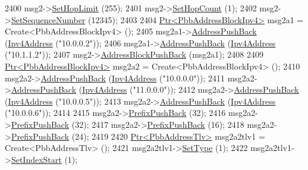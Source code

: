 \begin{DoxyCode}
2400     msg2->\hyperlink{classns3_1_1PbbMessage_a532a7e5e135f7491f8a84ab1dfadd28f}{SetHopLimit} (255);
2401     msg2->\hyperlink{classns3_1_1PbbMessage_a882ec7e2e9a9dff6297152c196d54ce4}{SetHopCount} (1);
2402     msg2->\hyperlink{classns3_1_1PbbMessage_a8c24696ac67507afa03c9750daccc47d}{SetSequenceNumber} (12345);
2403 
2404     \hyperlink{classns3_1_1Ptr}{Ptr<PbbAddressBlockIpv4>} msg2a1 = Create<PbbAddressBlockIpv4> ();
2405     msg2a1->\hyperlink{classns3_1_1PbbAddressBlock_a7be545a53d69bd426dbebcf752ed8371}{AddressPushBack} (\hyperlink{classns3_1_1Ipv4Address}{Ipv4Address} (\textcolor{stringliteral}{"10.0.0.2"}));
2406     msg2a1->\hyperlink{classns3_1_1PbbAddressBlock_a7be545a53d69bd426dbebcf752ed8371}{AddressPushBack} (\hyperlink{classns3_1_1Ipv4Address}{Ipv4Address} (\textcolor{stringliteral}{"10.1.1.2"}));
2407     msg2->\hyperlink{classns3_1_1PbbMessage_a5f623bad2fb1adde7da885e1c92d5311}{AddressBlockPushBack} (msg2a1);
2408 
2409     \hyperlink{classns3_1_1Ptr}{Ptr<PbbAddressBlockIpv4>} msg2a2 = Create<PbbAddressBlockIpv4> ();
2410     msg2a2->\hyperlink{classns3_1_1PbbAddressBlock_a7be545a53d69bd426dbebcf752ed8371}{AddressPushBack} (\hyperlink{classns3_1_1Ipv4Address}{Ipv4Address} (\textcolor{stringliteral}{"10.0.0.0"}));
2411     msg2a2->\hyperlink{classns3_1_1PbbAddressBlock_a7be545a53d69bd426dbebcf752ed8371}{AddressPushBack} (\hyperlink{classns3_1_1Ipv4Address}{Ipv4Address} (\textcolor{stringliteral}{"11.0.0.0"}));
2412     msg2a2->\hyperlink{classns3_1_1PbbAddressBlock_a7be545a53d69bd426dbebcf752ed8371}{AddressPushBack} (\hyperlink{classns3_1_1Ipv4Address}{Ipv4Address} (\textcolor{stringliteral}{"10.0.0.5"}));
2413     msg2a2->\hyperlink{classns3_1_1PbbAddressBlock_a7be545a53d69bd426dbebcf752ed8371}{AddressPushBack} (\hyperlink{classns3_1_1Ipv4Address}{Ipv4Address} (\textcolor{stringliteral}{"10.0.0.6"}));
2414 
2415     msg2a2->\hyperlink{classns3_1_1PbbAddressBlock_a8e6f539ccffd043a2890396d882d0a42}{PrefixPushBack} (32);
2416     msg2a2->\hyperlink{classns3_1_1PbbAddressBlock_a8e6f539ccffd043a2890396d882d0a42}{PrefixPushBack} (32);
2417     msg2a2->\hyperlink{classns3_1_1PbbAddressBlock_a8e6f539ccffd043a2890396d882d0a42}{PrefixPushBack} (16);
2418     msg2a2->\hyperlink{classns3_1_1PbbAddressBlock_a8e6f539ccffd043a2890396d882d0a42}{PrefixPushBack} (24);
2419 
2420     \hyperlink{classns3_1_1Ptr}{Ptr<PbbAddressTlv>} msg2a2tlv1 = Create<PbbAddressTlv> ();
2421     msg2a2tlv1->\hyperlink{classns3_1_1PbbTlv_a90a0452018ed364ac37c3ad116dd718b}{SetType} (1);
2422     msg2a2tlv1->\hyperlink{classns3_1_1PbbAddressTlv_a82d685ae4e4e2f6d2532cb212f5b2797}{SetIndexStart} (1);

\end{DoxyCode}
